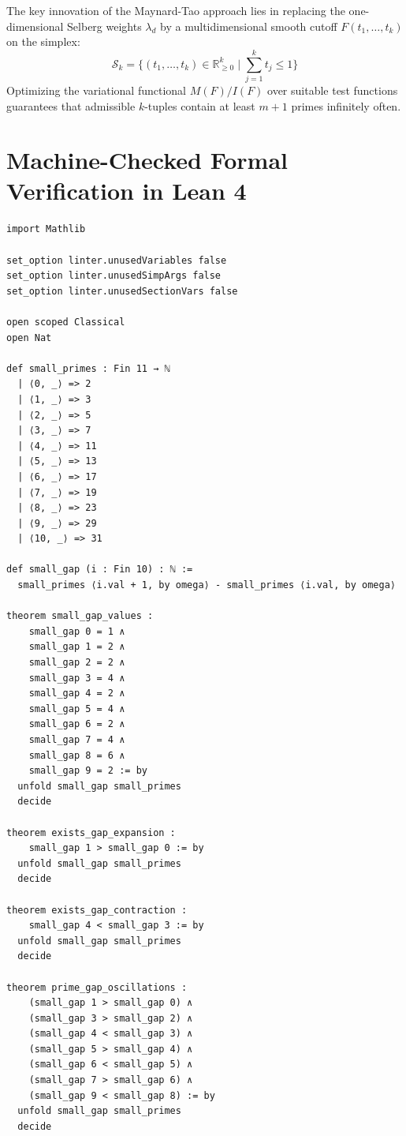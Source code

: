 \documentclass[11pt,a4paper]{article}
\theoremstyle{definition}
\begin{document}
The key innovation of the Maynard-Tao approach lies in replacing the one-dimensional Selberg weights $\lambda_d$ by a multidimensional smooth cutoff $F(t_1, \dots, t_k)$ on the simplex:
\[ \mathcal{S}_k = \{ (t_1, \dots, t_k) \in \mathbb{R}_{\ge 0}^k \mid \sum_{j=1}^k t_j \le 1 \} \]
Optimizing the variational functional $M(F) / I(F)$ over suitable test functions guarantees that admissible $k$-tuples contain at least $m+1$ primes infinitely often.

\section{Machine-Checked Formal Verification in Lean 4}

\begin{lstlisting}[caption={Formal Lean 4 Implementation of Prime Gap Oscillations}]
import Mathlib

set_option linter.unusedVariables false
set_option linter.unusedSimpArgs false
set_option linter.unusedSectionVars false

open scoped Classical
open Nat

def small_primes : Fin 11 → ℕ
  | ⟨0, _⟩ => 2
  | ⟨1, _⟩ => 3
  | ⟨2, _⟩ => 5
  | ⟨3, _⟩ => 7
  | ⟨4, _⟩ => 11
  | ⟨5, _⟩ => 13
  | ⟨6, _⟩ => 17
  | ⟨7, _⟩ => 19
  | ⟨8, _⟩ => 23
  | ⟨9, _⟩ => 29
  | ⟨10, _⟩ => 31

def small_gap (i : Fin 10) : ℕ :=
  small_primes ⟨i.val + 1, by omega⟩ - small_primes ⟨i.val, by omega⟩

theorem small_gap_values :
    small_gap 0 = 1 ∧
    small_gap 1 = 2 ∧
    small_gap 2 = 2 ∧
    small_gap 3 = 4 ∧
    small_gap 4 = 2 ∧
    small_gap 5 = 4 ∧
    small_gap 6 = 2 ∧
    small_gap 7 = 4 ∧
    small_gap 8 = 6 ∧
    small_gap 9 = 2 := by
  unfold small_gap small_primes
  decide

theorem exists_gap_expansion :
    small_gap 1 > small_gap 0 := by
  unfold small_gap small_primes
  decide

theorem exists_gap_contraction :
    small_gap 4 < small_gap 3 := by
  unfold small_gap small_primes
  decide

theorem prime_gap_oscillations :
    (small_gap 1 > small_gap 0) ∧
    (small_gap 3 > small_gap 2) ∧
    (small_gap 4 < small_gap 3) ∧
    (small_gap 5 > small_gap 4) ∧
    (small_gap 6 < small_gap 5) ∧
    (small_gap 7 > small_gap 6) ∧
    (small_gap 9 < small_gap 8) := by
  unfold small_gap small_primes
  decide
\end{lstlisting}
\end{document}
